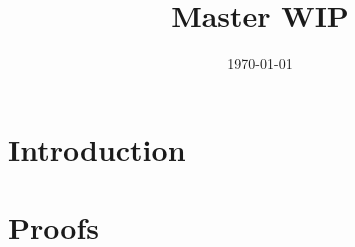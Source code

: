 \documentclass[11pt, a4paper]{article}   	%
\title{Master WIP}
\author{\name}
\date{\today}
\theoremstyle{plain}
\theoremstyle{definition}
\begin{document}
	\maketitle
  \section{Introduction}
  \label{sec:Introduction}
  
  
  
  
	
	
	
	
	\pagebreak
  \section{Proofs}
  \label{sub:Proofs}
  
	\pagebreak
	\printbibliography
\end{document}
